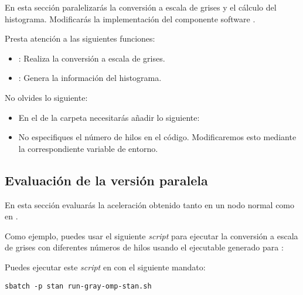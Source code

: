 En esta sección paralelizarás la conversión a escala de grises y el cálculo del
histograma. Modificarás la implementación del componente software
.

Presta atención a las siguientes funciones:

\begin{itemize}

\item {}: 
Realiza la conversión a escala de grises.
\item {}: 
Genera la información del histograma.

\end{itemize}

No olvides lo siguiente:

\begin{itemize}

\item En el  de la carpeta  
necesitarás añadir lo siguiente:



\item No especifiques el número de hilos en el código. Modificaremos esto
mediante la correspondiente variable de entorno.

\end{itemize}

\subsection{Evaluación de la versión paralela}

En esta sección evaluarás la aceleración obtenido tanto en un nodo normal como
en .

Como ejemplo, puedes usar el siguiente \emph{script} para ejecutar la conversión
a escala de grises con diferentes números de hilos usando el ejecutable generado
para :



Puedes ejecutar este \emph{script} en  con el siguiente mandato:

\begin{lstlisting}[style=terminal]
sbatch -p stan run-gray-omp-stan.sh
\end{lstlisting}
